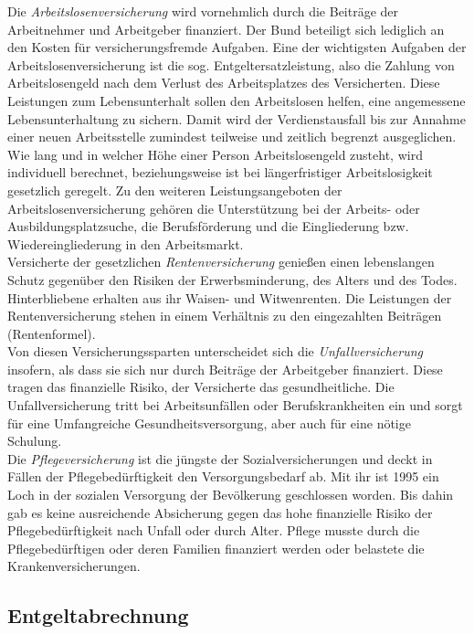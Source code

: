 \documentclass[a4paper, 12pt]{report}
\begin{document}
\begin{multicols}{2}
Die \emph{Arbeitslosenversicherung} wird vornehmlich durch die Beiträge der
Arbeitnehmer und Arbeitgeber finanziert. Der Bund beteiligt sich lediglich an
den Kosten für versicherungsfremde Aufgaben. Eine der wichtigsten Aufgaben der
Arbeitslosenversicherung ist die sog. Entgeltersatzleistung, also die Zahlung
von Arbeitslosengeld nach dem Verlust des Arbeitsplatzes des Versicherten. Diese
Leistungen zum Lebensunterhalt sollen den Arbeitslosen helfen, eine angemessene
Lebensunterhaltung zu sichern. Damit wird der Verdienstausfall bis zur Annahme
einer neuen Arbeitsstelle zumindest teilweise und zeitlich begrenzt
ausgeglichen. Wie lang und in welcher Höhe einer Person Arbeitslosengeld
zusteht, wird individuell berechnet, beziehungsweise ist bei längerfristiger
Arbeitslosigkeit gesetzlich geregelt. Zu den weiteren Leistungsangeboten der
Arbeitslosenversicherung gehören die Unterstützung bei der Arbeits- oder
Ausbildungsplatzsuche, die Berufsförderung und die Eingliederung bzw.
Wiedereingliederung in den Arbeitsmarkt. \\

Versicherte der gesetzlichen \emph{Rentenversicherung} genießen einen
lebenslangen Schutz gegenüber den Risiken der Erwerbsminderung, des Alters und
des Todes. Hinterbliebene erhalten aus ihr Waisen- und Witwenrenten. Die
Leistungen der Rentenversicherung stehen in einem Verhältnis zu den eingezahlten
Beiträgen (Rentenformel). \\

Von diesen Versicherungssparten unterscheidet sich die \emph{Unfallversicherung}
insofern, als dass sie sich nur durch Beiträge der Arbeitgeber finanziert. Diese
tragen das finanzielle Risiko, der Versicherte das gesundheitliche. Die
Unfallversicherung tritt bei Arbeitsunfällen oder Berufskrankheiten ein und
sorgt für eine Umfangreiche Gesundheitsversorgung, aber auch für eine nötige
Schulung. \\

Die \emph{Pflegeversicherung} ist die jüngste der Sozialversicherungen und deckt
in Fällen der Pflegebedürftigkeit den Versorgungsbedarf ab. Mit ihr ist 1995 ein
Loch in der sozialen Versorgung der Bevölkerung geschlossen worden. Bis dahin
gab es keine ausreichende Absicherung gegen das hohe finanzielle Risiko der
Pflegebedürftigkeit nach Unfall oder durch Alter. Pflege musste durch die
Pflegebedürftigen oder deren Familien finanziert werden oder belastete die
Krankenversicherungen.

\subsection{Entgeltabrechnung}


\end{multicols}
\end{document}
